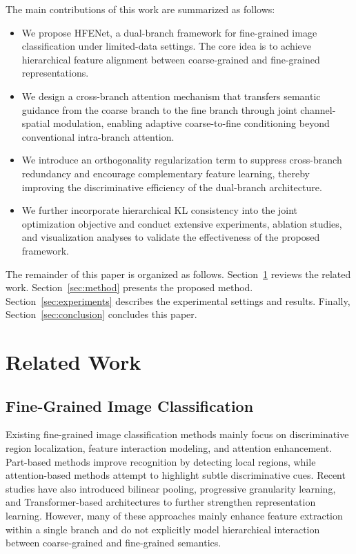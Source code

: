 \documentclass[pdflatex,sn-mathphys-num]{sn-jnl}
\theoremstyle{thmstyleone}%
\theoremstyle{thmstyletwo}%
\theoremstyle{thmstylethree}%
\begin{document}
The main contributions of this work are summarized as follows:
\begin{itemize}
    \item We propose HFENet, a dual-branch framework for fine-grained image classification under limited-data settings. The core idea is to achieve hierarchical feature alignment between coarse-grained and fine-grained representations.
    \item We design a cross-branch attention mechanism that transfers semantic guidance from the coarse branch to the fine branch through joint channel-spatial modulation, enabling adaptive coarse-to-fine conditioning beyond conventional intra-branch attention.
    \item We introduce an orthogonality regularization term to suppress cross-branch redundancy and encourage complementary feature learning, thereby improving the discriminative efficiency of the dual-branch architecture.
    \item We further incorporate hierarchical KL consistency into the joint optimization objective and conduct extensive experiments, ablation studies, and visualization analyses to validate the effectiveness of the proposed framework.
\end{itemize}

The remainder of this paper is organized as follows. 
Section~\ref{sec:related_work} reviews the related work. 
Section~\ref{sec:method} presents the proposed method. 
Section~\ref{sec:experiments} describes the experimental settings and results. 
Finally, Section~\ref{sec:conclusion} concludes this paper.

\section{Related Work}
\label{sec:related_work}

\subsection{Fine-Grained Image Classification}
Existing fine-grained image classification methods mainly focus on discriminative region localization, feature interaction modeling, and attention enhancement. 
Part-based methods improve recognition by detecting local regions, while attention-based methods attempt to highlight subtle discriminative cues. 
Recent studies have also introduced bilinear pooling, progressive granularity learning, and Transformer-based architectures to further strengthen representation learning. 
However, many of these approaches mainly enhance feature extraction within a single branch and do not explicitly model hierarchical interaction between coarse-grained and fine-grained semantics.
\end{document}
